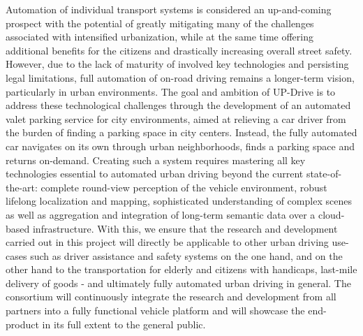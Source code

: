 Automation of individual transport systems is considered an up-and-coming prospect with the potential of greatly mitigating many of the challenges associated with intensified urbanization, while at the same time offering additional benefits for the citizens and drastically increasing overall street safety. However, due to the lack of maturity of involved key technologies and persisting legal limitations, full automation of on-road driving remains a longer-term vision, particularly in urban environments. 
The goal and ambition of UP-Drive is to address these technological challenges through the development of an automated valet parking service for city environments, aimed at relieving a car driver from the burden of finding a parking space in city centers. Instead, the fully automated car navigates on its own through urban neighborhoods, finds a parking space and returns on-demand.
Creating such a system requires mastering all key technologies essential to automated urban driving beyond the current state-of-the-art: complete round-view perception of the vehicle environment, robust lifelong localization and mapping, sophisticated understanding of complex scenes as well as aggregation and integration of long-term semantic data over a cloud-based infrastructure. With this, we ensure that the research and development carried out in this project will directly be applicable to other urban driving use-cases such as driver assistance and safety systems on the one hand, and on the other hand to the transportation for elderly and citizens with handicaps, last-mile delivery of goods - and ultimately fully automated urban driving in general.
The consortium will continuously integrate the research and development from all partners into a fully functional vehicle platform and will showcase the end-product in its full extent to the general public.

